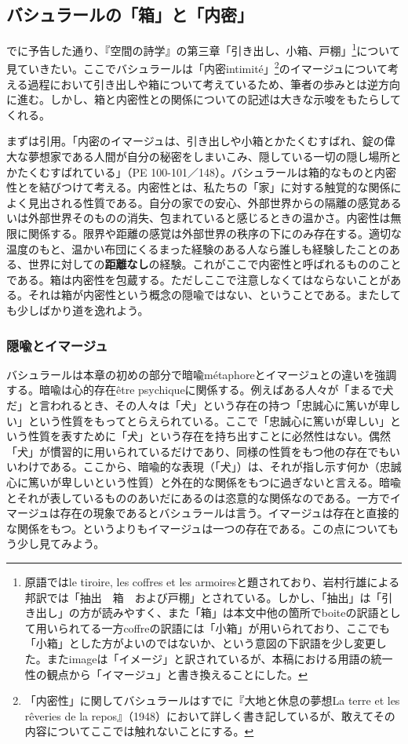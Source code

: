 \documentclass[b5j,twoside,twocolumn]{utarticle}
\begin{document}
\subsection{バシュラールの「箱」と「内密」}
でに予告した通り、『空間の詩学』の第三章「引き出し、小箱、戸棚」\footnote{原語ではle tiroire, les coffres et les armoiresと題されており、岩村行雄による邦訳では「抽出　箱　および戸棚」とされている。しかし、「抽出」は「引き出し」の方が読みやすく、また「箱」は本文中他の箇所でboiteの訳語として用いられてる一方coffreの訳語には「小箱」が用いられており、ここでも「小箱」とした方がよいのではないか、という意図の下訳語を少し変更した。またimageは「イメージ」と訳されているが、本稿における用語の統一性の観点から「イマージュ」と書き換えることにした。}について見ていきたい。ここでバシュラールは「内密intimité」\footnote{「内密性」に関してバシュラールはすでに『大地と休息の夢想La terre et les rêveries de la repos』（1948）において詳しく書き記しているが、敢えてその内容についてここでは触れないことにする。}のイマージュについて考える過程において引き出しや箱について考えているため、筆者の歩みとは逆方向に進む。しかし、箱と内密性との関係についての記述は大きな示唆をもたらしてくれる。


まずは引用。「内密のイマージュは、引き出しや小箱とかたくむすばれ、錠の偉大な夢想家である人間が自分の秘密をしまいこみ、隠している一切の隠し場所とかたくむすばれている」（PE 100-101／148）。バシュラールは箱的なものと内密性とを結びつけて考える。内密性とは、私たちの「家」に対する触覚的な関係によく見出される性質である。自分の家での安心、外部世界からの隔離の感覚あるいは外部世界そのものの消失、包まれていると感じるときの温かさ。内密性は無限に関係する。限界や距離の感覚は外部世界の秩序の下にのみ存在する。適切な温度のもと、温かい布団にくるまった経験のある人なら誰しも経験したことのある、世界に対しての\textbf{距離なし}の経験。これがここで内密性と呼ばれるもののことである。箱は内密性を包蔵する。ただしここで注意しなくてはならないことがある。それは箱が内密性という概念の隠喩ではない、ということである。またしても少しばかり道を逸れよう。
\subsubsection{隠喩とイマージュ}
バシュラールは本章の初めの部分で暗喩métaphoreとイマージュとの違いを強調する。暗喩は心的存在être psychiqueに関係する。例えばある人々が「まるで犬だ」と言われるとき、その人々は「犬」という存在の持つ「忠誠心に篤いが卑しい」という性質をもってとらえられている。ここで「忠誠心に篤いが卑しい」という性質を表すために「犬」という存在を持ち出すことに必然性はない。偶然「犬」が慣習的に用いられているだけであり、同様の性質をもつ他の存在でもいいわけである。ここから、暗喩的な表現（「犬」）は、それが指し示す何か（忠誠心に篤いが卑しいという性質）と外在的な関係をもつに過ぎないと言える。暗喩とそれが表しているもののあいだにあるのは恣意的な関係なのである。一方でイマージュは存在の現象であるとバシュラールは言う。イマージュは存在と直接的な関係をもつ。というよりもイマージュは一つの存在である。この点についてもう少し見てみよう。
\end{document}
